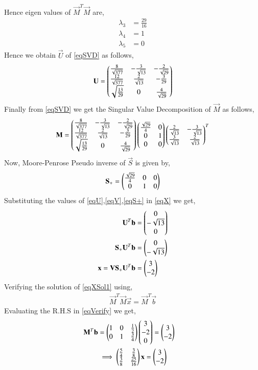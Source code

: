 \documentclass[journal,12pt,twocolumn]{IEEEtran}
\begin{document}
Hence eigen values of $\vec{M}^T\vec{M}$ are,
\begin{align}
\lambda_3 &=\frac{29}{16}\\
\lambda_4 &= 1\\
\lambda_5 &= 0
\end{align}
Hence we obtain $\vec{U}$ of \eqref{eqSVD} as follows,
\begin{align}
\mathbf{U}=\label{eqU}\begin{pmatrix}\frac{8}{\sqrt{377}}&-\frac{3}{\sqrt{13}}&-\frac{2}{\sqrt{29}}\\\frac{12}{\sqrt{377}}&\frac{2}{\sqrt{13}}&-\frac{3}{29}\\\sqrt{\frac{13}{29}}&0&\frac{4}{\sqrt{29}}\end{pmatrix}
\end{align}
Finally from \eqref{eqSVD} we get the Singular Value Decomposition of $\vec{M}$ as follows,
\begin{align}
\mathbf{M} = \begin{pmatrix}\frac{8}{\sqrt{377}}&-\frac{3}{\sqrt{13}}&-\frac{2}{\sqrt{29}}\\\frac{12}{\sqrt{377}}&\frac{2}{\sqrt{13}}&-\frac{3}{29}\\\sqrt{\frac{13}{29}}&0&\frac{4}{\sqrt{29}}\end{pmatrix}\begin{pmatrix}\frac{\sqrt{29}}{4}&0\\0&1\\0&0\end{pmatrix}\begin{pmatrix}\frac{2}{\sqrt{13}}&-\frac{3}{\sqrt{13}}\\ \frac{3}{\sqrt{13}}&\frac{2}{\sqrt{13}}\end{pmatrix}^T
\end{align}
Now, Moore-Penrose Pseudo inverse of $\vec{S}$ is given by,
\begin{align}
\mathbf{S_+} = \begin{pmatrix}\frac{\sqrt{29}}{4}&0&0\\0&1&0\end{pmatrix}\label{eqS+}
\end{align}
Substituting the values of \eqref{eqU},\eqref{eqV},\eqref{eqS+} in \eqref{eqX}  we get,
\begin{align}
\mathbf{U}^T\mathbf{b}&=\begin{pmatrix}0\\-\sqrt{13}\\0\end{pmatrix}\\
\mathbf{S_+}\mathbf{U}^T\mathbf{b}&=\begin{pmatrix}0\\-\sqrt{13}\end{pmatrix}\\
\mathbf{x} = \mathbf{V}\mathbf{S_+}\mathbf{U}^T\mathbf{b} &= \begin{pmatrix}3\\-2\end{pmatrix}\label{eqXSol1}
\end{align}
Verifying the solution of \eqref{eqXSol1} using,
\begin{align}
\vec{M}^T\vec{M}\vec{x} = \vec{M}^T\vec{b}\label{eqVerify}
\end{align}
Evaluating the R.H.S in \eqref{eqVerify} we get,
\begin{align}
\mathbf{M}^T\mathbf{b} &= \begin{pmatrix}1&0&\frac{1}{2}\\0&1&\frac{3}{4}\end{pmatrix}\begin{pmatrix}3\\-2\\0\end{pmatrix}=\begin{pmatrix}3\\-2\end{pmatrix}\\
&\implies\begin{pmatrix}\frac{5}{4}&\frac{3}{8}\\\frac{3}{8}&\frac{25}{16}\end{pmatrix}\mathbf{x} = \begin{pmatrix}3\\-2\end{pmatrix}&\label{eqMateq}
\end{align}
\end{document}

